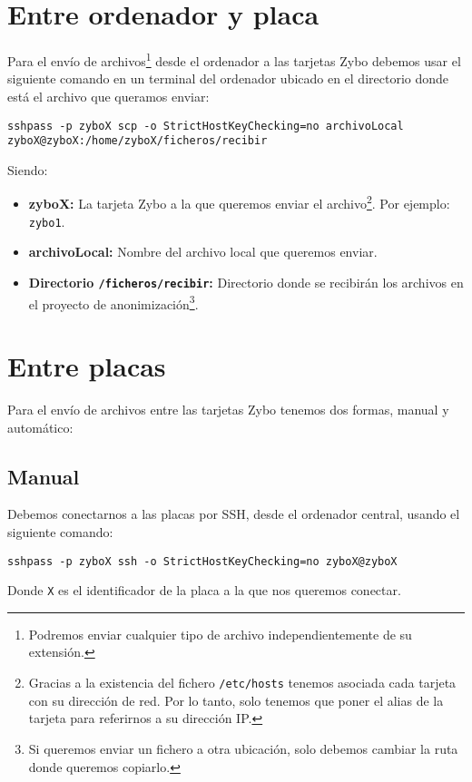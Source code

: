 \documentclass[12pt,letterpaper]{article}
\begin{document}
\section{Entre ordenador y placa}
Para el envío de archivos\footnote{Podremos enviar cualquier tipo de archivo independientemente de su extensión.} desde el ordenador a las tarjetas Zybo debemos usar el siguiente comando en un terminal del ordenador ubicado en el directorio donde está el archivo que queramos enviar:
\begin{center}
	\texttt{sshpass -p zyboX scp -o StrictHostKeyChecking=no archivoLocal zyboX@zyboX:/home/zyboX/ficheros/recibir}
\end{center}
Siendo:
\begin{itemize}
	\item \textbf{zyboX:} La tarjeta Zybo a la que queremos enviar el archivo\footnote{Gracias a la existencia del fichero \texttt{/etc/hosts} tenemos asociada cada tarjeta con su dirección de red. Por lo tanto, solo tenemos que poner el alias de la tarjeta para referirnos a su dirección IP.}. Por ejemplo: \texttt{zybo1}.
	\item \textbf{archivoLocal:} Nombre del archivo local que queremos enviar.
	\item \textbf{Directorio \texttt{/ficheros/recibir}:} Directorio donde se recibirán los archivos en el proyecto de anonimización\footnote{Si queremos enviar un fichero a otra ubicación, solo debemos cambiar la ruta donde queremos copiarlo.}.
\end{itemize}

\section{Entre placas}
Para el envío de archivos entre las tarjetas Zybo tenemos dos formas, manual y automático:

\subsection{Manual}
Debemos conectarnos a las placas por SSH, desde el ordenador central, usando el siguiente comando:
\begin{center}
	\texttt{sshpass -p zyboX ssh -o StrictHostKeyChecking=no zyboX@zyboX}
\end{center}
Donde \texttt{X} es el identificador de la placa a la que nos queremos conectar.
\end{document}

